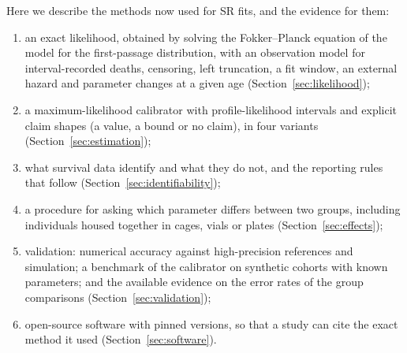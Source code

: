 Here we describe the methods now used for SR fits, and the evidence for them:
\begin{enumerate}[leftmargin=1.5em,itemsep=1pt]
  \item an exact likelihood, obtained by solving the Fokker--Planck equation of the model for the first-passage
    distribution, with an observation model for interval-recorded deaths, censoring, left truncation, a fit window,
    an external hazard and parameter changes at a given age (Section~\ref{sec:likelihood});
  \item a maximum-likelihood calibrator with profile-likelihood intervals and explicit claim shapes (a value, a bound
    or no claim), in four variants (Section~\ref{sec:estimation});
  \item what survival data identify and what they do not, and the reporting rules that follow
    (Section~\ref{sec:identifiability});
  \item a procedure for asking which parameter differs between two groups, including individuals housed together in cages, vials or plates
    (Section~\ref{sec:effects});
  \item validation: numerical accuracy against high-precision references and simulation; a benchmark of the
    calibrator on  synthetic cohorts with known parameters; and the available evidence on the error
    rates of the group comparisons (Section~\ref{sec:validation});
  \item open-source software with pinned versions, so that a study can cite the exact method it used
    (Section~\ref{sec:software}).
\end{enumerate}

